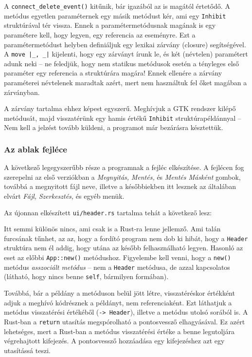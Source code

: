 A \verb+connect_delete_event()+ kitűnik, bár igazából az is magától értetődő.
A metódus egyetlen paraméternek egy másik metódust kér, ami egy \texttt{Inhibit} struktúrával tér vissza.
Ennek a paramétermetódusnak magának is egy paramétere kell, hogy legyen, egy referencia az eseményre.
Ezt a paramétermetódust helyben definiáljuk egy lexikai zárvány (closure) segítségével.
A \verb+move |_, _|+ kijelenti, hogy egy zárványt írunk le, és két (névtelen) paramétert adunk neki --
ne feledjük, hogy nem statikus metódusok esetén a tényleges első paraméter egy referencia a struktúrára magára!
Ennek ellenére a zárvány paraméterei névtelenek maradtak azért, mert nem használtuk fel őket magában a zárványban.

A zárvány tartalma ehhez képest egyszerű.
Meghívjuk a GTK rendszer kilépő metódusát, majd visszatérünk egy hamis értékű \texttt{Inhibit} struktúrapéldánnyal --
Nem kell a jelzést tovább küldeni, a programot már bezárásra késztettük.

\subsubsection{Az ablak fejléce}

A következő legegyszerűbb része a programnak a fejléc elkészítése.
A fejlécen fog szerepelni az első verziókban a \textit{Megnyitás,} \textit{Mentés,} és \textit{Mentés Másként}
gombok, továbbá a megnyitott fájl neve,
illetve a későbbiekben itt lesznek az általában elvárt \textit{Fájl,} \textit{Szerkesztés,} és egyéb menük.

Az újonnan elkészített \texttt{ui/header.rs} tartalma tehát a következő lesz:



Itt semmi különös nincs, ami csak is a Rust-ra lenne jellemző.
Ami talán furcsának tűnhet, az az, hogy a fordító program nem dob ki hibát,
hogy a \texttt{Header} struktúra nem él addig, hogy utána az később felhasználható legyen.
Hasonló az eset az előbbi \texttt{App::new()} metódushoz.
Figyelembe kell venni, hogy a \texttt{new()} metódus \textit{asszociált metódus} --
nem a \texttt{Header} metódusa, de azzal kapcsolatos (látható, hogy nincs benne \texttt{self}, bármilyen formában).

Továbbá, bár a példány a metóduson belül jött létre, visszatéréskor értékként adjuk a meghívó
kódrésznek a példányt, nem referenciaként.
Ezt láthatjuk a metódus visszatérési értékéből (\verb+-> Header+), 
illetve a metódus utolsó sorából is.
A Rust-ban a \texttt{return} utasítás megspórolható a pontosvessző elhagyásával.
Ez azért lehetséges, mert a Rust-ban a metódus visszatérési értéke a benne legutoljára végrehajtott kifejezés.
A pontosvessző hozzáadása egy kifejezéshez azt egy utasítássá teszi.

